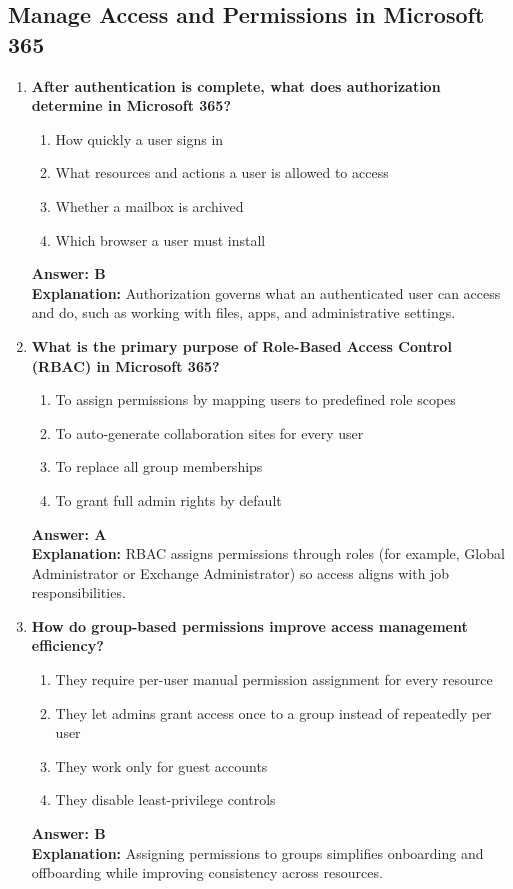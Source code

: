 \documentclass[10pt]{article}
\begin{document}
\subsection{Manage Access and Permissions in Microsoft 365}
\begin{enumerate}[leftmargin=*]

\item \textbf{After authentication is complete, what does authorization determine in Microsoft 365?}
\begin{enumerate}[label=\Alph*.]
  \item How quickly a user signs in
  \item What resources and actions a user is allowed to access
  \item Whether a mailbox is archived
  \item Which browser a user must install
\end{enumerate}
\textbf{Answer: B}\\
\textbf{Explanation:} Authorization governs what an authenticated user can access and do, such as working with files, apps, and administrative settings.

\item \textbf{What is the primary purpose of Role-Based Access Control (RBAC) in Microsoft 365?}
\begin{enumerate}[label=\Alph*.]
  \item To assign permissions by mapping users to predefined role scopes
  \item To auto-generate collaboration sites for every user
  \item To replace all group memberships
  \item To grant full admin rights by default
\end{enumerate}
\textbf{Answer: A}\\
\textbf{Explanation:} RBAC assigns permissions through roles (for example, Global Administrator or Exchange Administrator) so access aligns with job responsibilities.

\item \textbf{How do group-based permissions improve access management efficiency?}
\begin{enumerate}[label=\Alph*.]
  \item They require per-user manual permission assignment for every resource
  \item They let admins grant access once to a group instead of repeatedly per user
  \item They work only for guest accounts
  \item They disable least-privilege controls
\end{enumerate}
\textbf{Answer: B}\\
\textbf{Explanation:} Assigning permissions to groups simplifies onboarding and offboarding while improving consistency across resources.


\end{enumerate}
\end{document}
